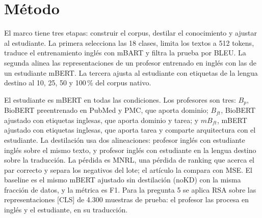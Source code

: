 \section{Método}
\label{sec:metodo}

El marco tiene tres etapas: construir el corpus, destilar el conocimiento y ajustar al estudiante. La primera selecciona las 18 clases, limita los textos a 512 tokens, traduce el entrenamiento inglés con mBART y filtra la prueba por BLEU. La segunda alinea las representaciones de un profesor entrenado en inglés con las de un estudiante mBERT. La tercera ajusta al estudiante con etiquetas de la lengua destino al 10, 25, 50 y 100\,\% del corpus nativo.

El estudiante es mBERT en todas las condiciones. Los profesores son tres: $B_p$, BioBERT preentrenado en PubMed y PMC, que aporta dominio; $B_{ft}$, BioBERT ajustado con etiquetas inglesas, que aporta dominio y tarea; y $mB_{ft}$, mBERT ajustado con etiquetas inglesas, que aporta tarea y comparte arquitectura con el estudiante. La destilación usa dos alineaciones: profesor inglés con estudiante inglés sobre el mismo texto, y profesor inglés con estudiante en la lengua destino sobre la traducción. La pérdida es MNRL, una pérdida de ranking que acerca el par correcto y separa los negativos del lote; el artículo la compara con MSE. El baseline es el mismo mBERT ajustado sin destilación (noKD) con la misma fracción de datos, y la métrica es F1. Para la pregunta 5 se aplica RSA sobre las representaciones [CLS] \cite{devlin2019} de 4.300 muestras de prueba: el profesor las procesa en inglés y el estudiante, en su traducción.
